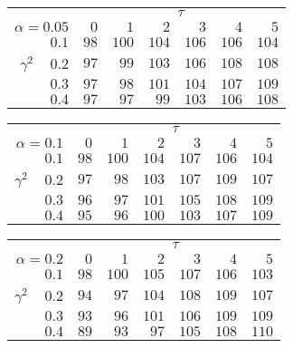 \begin{tabular}{r|rrrrrr}
\hline\hline
 &\multicolumn{6}{c}{$\tau$} \\ 
 $\alpha = 0.05$ & $0$ & $1$ & $2$ & $3$ & $4$ & $5$ \\ 
 \hline$0.1$ & $ 98$ & $100$ & $104$ & $106$ & $106$ & $104$\\ 
$\gamma^2\;\;\;$ $0.2$ & $ 97$ & $ 99$ & $103$ & $106$ & $108$ & $108$\\ 
$0.3$ & $ 97$ & $ 98$ & $101$ & $104$ & $107$ & $109$\\ 
$0.4$ & $ 97$ & $ 97$ & $ 99$ & $103$ & $106$ & $108$\\ 
 \hline 
 \end{tabular}
 
 \vspace{2em} 
 
\begin{tabular}{r|rrrrrr}
\hline\hline
 &\multicolumn{6}{c}{$\tau$} \\ 
 $\alpha = 0.1$ & $0$ & $1$ & $2$ & $3$ & $4$ & $5$ \\ 
 \hline$0.1$ & $ 98$ & $100$ & $104$ & $107$ & $106$ & $104$\\ 
$\gamma^2\;\;\;$ $0.2$ & $ 97$ & $ 98$ & $103$ & $107$ & $109$ & $107$\\ 
$0.3$ & $ 96$ & $ 97$ & $101$ & $105$ & $108$ & $109$\\ 
$0.4$ & $ 95$ & $ 96$ & $100$ & $103$ & $107$ & $109$\\ 
 \hline 
 \end{tabular}
 
 \vspace{2em} 
 
\begin{tabular}{r|rrrrrr}
\hline\hline
 &\multicolumn{6}{c}{$\tau$} \\ 
 $\alpha = 0.2$ & $0$ & $1$ & $2$ & $3$ & $4$ & $5$ \\ 
 \hline$0.1$ & $ 98$ & $100$ & $105$ & $107$ & $106$ & $103$\\ 
$\gamma^2\;\;\;$ $0.2$ & $ 94$ & $ 97$ & $104$ & $108$ & $109$ & $107$\\ 
$0.3$ & $ 93$ & $ 96$ & $101$ & $106$ & $109$ & $109$\\ 
$0.4$ & $ 89$ & $ 93$ & $ 97$ & $105$ & $108$ & $110$\\ 
 \hline 
 \end{tabular}